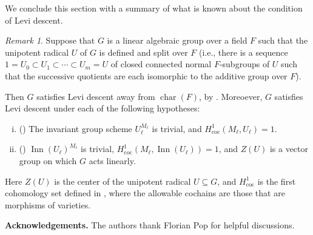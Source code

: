 \documentclass[12pt]{amsart}
\newcommand{\coc}{\oper{coc}}
\newcommand{\Inn}{\oper{Inn}}
\theoremstyle{plain}
\theoremstyle{definition}
\theoremstyle{remark}
\newtheorem{rem}[thm]{Remark}
\newcommand{\oper}[1]{\operatorname{#1}}
\newcommand{\cha}{\oper{char}}
\begin{document}
We conclude this section with a summary of what is known about the condition of Levi descent.
\begin{rem}\label{descent_remark}
Suppose that $G$ is a linear algebraic group over a field $F$ such that the unipotent radical $U$ of $G$ is defined and split over $F$ (i.e., there is a sequence $1 = U_0 \subset U_1 \subset \cdots \subset U_m = U$ of closed connected normal $F$-subgroups of $U$ such that the successive quotients are each isomorphic to the additive group over $F$).  

Then $G$ satisfies Levi descent away from $\cha(F)$, by \cite[Theorem~3.4.3]{McNinch13}. Moreoever, $G$ satisfies Levi descent under each of the following hypotheses:

\begin{enumerate} [(i)]
\item (\cite[Theorem~1.6]{McNinch}) The invariant group scheme $U_\ell^{M_\ell}$ is trivial, and $H^1_{\coc}(M_\ell,U_\ell)=1$.

\item (\cite[Theorem~1.7]{McNinch}) $\Inn(U_\ell)^{M_\ell}$ is trivial, $H^1_{\coc}(M_\ell,\Inn(U_\ell))=1$, and $Z(U)$ is a vector group on which $G$ acts linearly.
\end{enumerate}

\noindent Here $Z(U)$ is the center of the unipotent radical $U \subseteq G$, and $H^1_{\coc}$ is the first cohomology set defined in \cite[Section~3]{McNinch}, where the allowable cochains are those that are morphisms of varieties.


\end{rem}

{\bf Acknowledgements.} The authors thank Florian Pop for helpful discussions.
\end{document}
